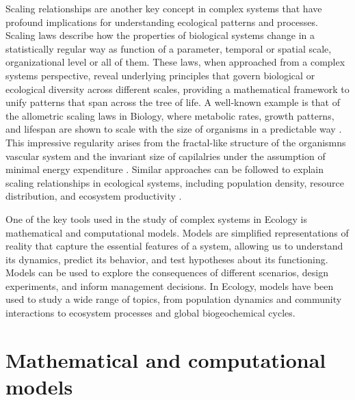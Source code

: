 Scaling relationships are another key concept in complex systems that have
profound implications for understanding ecological patterns and processes.
Scaling laws describe how the properties of biological systems change in a
statistically regular way as function of a parameter, temporal or spatial
scale, organizational level or all of them. These laws, when approached from a
complex systems perspective, reveal underlying principles that govern
biological or ecological diversity across different scales, providing a
mathematical framework to unify patterns that span across the tree of life. A
well-known example is that of the allometric scaling laws in Biology, where
metabolic rates, growth patterns, and lifespan are shown to scale with the size
of organisms in a predictable way \cite{Peters1983}. This impressive regularity
arises from the fractal-like structure of the organismns vascular system and
the invariant size of capilalries under the assumption of minimal
energy expenditure \cite{West1997}. Similar approaches can be followed to
explain scaling relationships in ecological systems, including population
density, resource distribution, and ecosystem productivity \cite{Brown2004}.

One of the key tools used in the study of complex systems in Ecology is
mathematical and computational models. Models are simplified representations of
reality that capture the essential features of a system, allowing us to
understand its dynamics, predict its behavior, and test hypotheses about its
functioning. Models can be used to explore the consequences of different
scenarios, design experiments, and inform management decisions. In Ecology,
models have been used to study a wide range of topics, from population dynamics
and community interactions to ecosystem processes and global biogeochemical
cycles.

\section{\label{sec:Mathematical and computational models} Mathematical and
  computational models}

